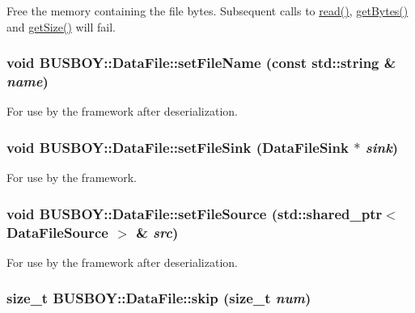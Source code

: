 Free the memory containing the file bytes. Subsequent calls to \hyperlink{classBUSBOY_1_1DataFile_a104c0a452496118e024a1c5f1a68753b}{read()}, \hyperlink{classBUSBOY_1_1DataFile_a45fde9d4a579facec44247df8d15aaff}{getBytes()} and \hyperlink{classBUSBOY_1_1DataFile_a13be7facfe1635e78e148da160b9f5a8}{getSize()} will fail. \hypertarget{classBUSBOY_1_1DataFile_a9c9f9d2cfcc56e363c88b9f95e6b71b9}{
\subsubsection[{setFileName}]{\setlength{\rightskip}{0pt plus 5cm}void BUSBOY::DataFile::setFileName (const std::string \& {\em name})}}
\label{classBUSBOY_1_1DataFile_a9c9f9d2cfcc56e363c88b9f95e6b71b9}


For use by the framework after deserialization. \hypertarget{classBUSBOY_1_1DataFile_ac1bc9a0297a076719033d83586c7e992}{
\subsubsection[{setFileSink}]{\setlength{\rightskip}{0pt plus 5cm}void BUSBOY::DataFile::setFileSink ({\bf DataFileSink} $\ast$ {\em sink})}}
\label{classBUSBOY_1_1DataFile_ac1bc9a0297a076719033d83586c7e992}


For use by the framework. \hypertarget{classBUSBOY_1_1DataFile_ad61684b1f604a6a59acd656620113987}{
\subsubsection[{setFileSource}]{\setlength{\rightskip}{0pt plus 5cm}void BUSBOY::DataFile::setFileSource (std::shared\_\-ptr$<$ {\bf DataFileSource} $>$ \& {\em src})}}
\label{classBUSBOY_1_1DataFile_ad61684b1f604a6a59acd656620113987}


For use by the framework after deserialization. \hypertarget{classBUSBOY_1_1DataFile_a6fbe7dc10df61744c7a11ea80be709d8}{
\subsubsection[{skip}]{\setlength{\rightskip}{0pt plus 5cm}size\_\-t BUSBOY::DataFile::skip (size\_\-t {\em num})}}
\label{classBUSBOY_1_1DataFile_a6fbe7dc10df61744c7a11ea80be709d8}



